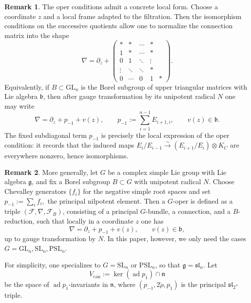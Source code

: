 \documentclass[twoside, 11pt]{article}
\numberwithin{equation}{section}
\theoremstyle{theorem}
\numberwithin{theorem}{section}
\theoremstyle{definition}
\newtheorem{remark}[remark]{Remark}
\begin{document}
\begin{remark}
The oper conditions admit a concrete local form. 
Choose a coordinate $z$ and a local frame adapted to the filtration.
Then the isomorphism conditions on the successive quotients allow one to normalize the connection matrix into the shape
\[
\nabla=\partial_z+
\begin{pmatrix}
* & * & \cdots & * \\
1 & * & \cdots & * \\
0 & 1 & \ddots & \vdots \\
\vdots & \ddots & \ddots & * \\
0 & \cdots & 0 & 1 & *
\end{pmatrix}.
\]
Equivalently, if $B\subset \mathrm{GL}_n$ is the Borel subgroup of upper triangular matrices with Lie algebra $\mathfrak b$, then after gauge transformation by its unipotent radical $N$ one may write
\begin{equation}\label{eq:oper-local-DS}
\nabla=\partial_z+p_{-1}+v(z),
\qquad
p_{-1}:=\sum_{i=1}^{n-1}E_{i+1,i},
\qquad
v(z)\in\mathfrak b.
\end{equation}
The fixed subdiagonal term $p_{-1}$ is precisely the local expression of the oper condition: it records that the induced maps
\(
E_i/E_{i-1}\xrightarrow{\sim}(E_{i+1}/E_i)\otimes K_C
\)
are everywhere nonzero, hence isomorphisms.
\end{remark}

\begin{remark}
More generally, let $G$ be a complex simple Lie group with Lie algebra $\mathfrak g$, and fix a Borel subgroup $B\subset G$ with unipotent radical $N$. 
Choose Chevalley generators $\{f_i\}$ for the negative simple root spaces and set
\(
p_{-1}:=\sum_i f_i,
\)
the principal nilpotent element. 
Then a $G$-oper is defined as a triple $(\mathcal F,\nabla,\mathcal F_B)$, consisting of a principal $G$-bundle, a connection, and a $B$-reduction, such that locally in a coordinate $z$ one has
\[
\nabla=\partial_z+p_{-1}+v(z),
\qquad v(z)\in\mathfrak b,
\]
up to gauge transformation by $N$. 
In this paper, however, we only need the cases $G=\mathrm{GL}_n,\mathrm{SL}_n,\mathrm{PSL}_n$.
\end{remark}

For simplicity, one specializes to $G=\mathrm{SL}_n$ or $\mathrm{PSL}_n$, so that
$\mathfrak g=\mathfrak{sl}_n$. 
Let
\[
V_{\mathrm{can}}:=\ker(\operatorname{ad} p_1)\cap \mathfrak n
\]
be the space of $\operatorname{ad} p_1$-invariants in $\mathfrak n$, where
$(p_{-1},2\check\rho,p_1)$ is the principal $\mathfrak{sl}_2$-triple.
\end{document}
